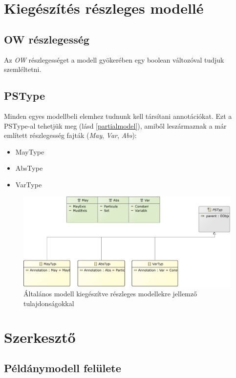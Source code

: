 \section{Kiegészítés részleges modellé}

\subsection{OW részlegesség}
Az \textit{OW} részlegességet a modell gyökerében egy boolean változóval tudjuk szemléltetni.

\subsection{PSType}
Minden egyes modellbeli elemhez tudnunk kell társítani annotációkat. Ezt a PSType-al tehetjük meg (lásd \autoref{partialmodel}), amiből leszármaznak a már említett részlegesség fajták (\textit{May}, \textit{Var}, \textit{Abs}):

\begin{itemize}  
	\item MayType
	\item AbsType
	\item VarType 
\end{itemize}

\begin{figure}[!ht]
	\centering
	\includegraphics[width=150mm]{figures/partialmodel02.pdf}
	\caption{Általános modell kiegészítve részleges modellekre jellemző tulajdonságokkal}
	\label{partialmodel} 
\end{figure}

\section{Szerkesztő}
\subsection{Példánymodell felülete}
